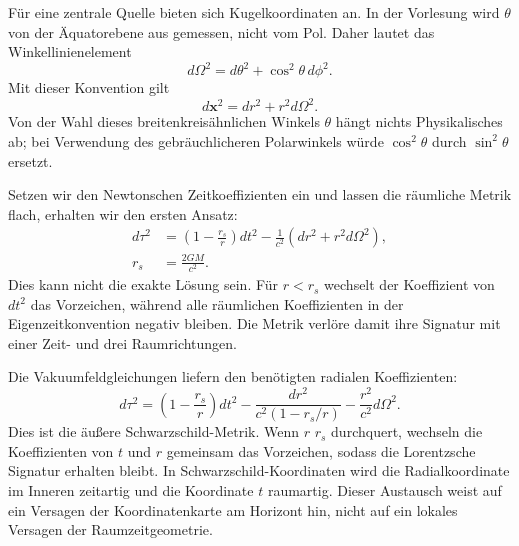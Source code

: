 Für eine zentrale Quelle bieten sich Kugelkoordinaten an. In der Vorlesung wird \(\theta\) von der Äquatorebene aus gemessen, nicht vom Pol. Daher lautet das Winkellinienelement
\begin{equation}
d\Omega^2=d\theta^2+\cos^2\theta\,d\phi^2.
\label{eq:l5-angular-metric}
\end{equation}
Mit dieser Konvention gilt
\begin{equation}
d\mathbf{x}^2=dr^2+r^2d\Omega^2.
\label{eq:l5-flat-spherical}
\end{equation}
Von der Wahl dieses breitenkreisähnlichen Winkels \(\theta\) hängt nichts Physikalisches ab; bei Verwendung des gebräuchlicheren Polarwinkels würde \(\cos^2\theta\) durch \(\sin^2\theta\) ersetzt.

Setzen wir den Newtonschen Zeitkoeffizienten ein und lassen die räumliche Metrik flach, erhalten wir den ersten Ansatz:
\begin{equation}
\begin{aligned}
d\tau^2
&=\left(1-\frac{r_s}{r}\right)dt^2
-\frac{1}{c^2}\left(dr^2+r^2d\Omega^2\right),\\
r_s&=\frac{2GM}{c^2}.
\end{aligned}
\label{eq:l5-naive-schwarzschild}
\end{equation}
Dies kann nicht die exakte Lösung sein. Für \(r<r_s\) wechselt der Koeffizient von \(dt^2\) das Vorzeichen, während alle räumlichen Koeffizienten in der Eigenzeitkonvention negativ bleiben. Die Metrik verlöre damit ihre Signatur mit einer Zeit- und drei Raumrichtungen.

Die Vakuumfeldgleichungen liefern den benötigten radialen Koeffizienten:
\begin{equation}
\boxed{
d\tau^2
=\left(1-\frac{r_s}{r}\right)dt^2
-\frac{dr^2}{c^2\left(1-r_s/r\right)}
-\frac{r^2}{c^2}d\Omega^2.
}
\label{eq:l5-schwarzschild}
\end{equation}
Dies ist die äußere Schwarzschild-Metrik. Wenn \(r\) \(r_s\) durchquert, wechseln die Koeffizienten von \(t\) und \(r\) gemeinsam das Vorzeichen, sodass die Lorentzsche Signatur erhalten bleibt. In Schwarzschild-Koordinaten wird die Radialkoordinate im Inneren zeitartig und die Koordinate \(t\) raumartig. Dieser Austausch weist auf ein Versagen der Koordinatenkarte am Horizont hin, nicht auf ein lokales Versagen der Raumzeitgeometrie.

\begin{classroomqa}
\end{classroomqa}


